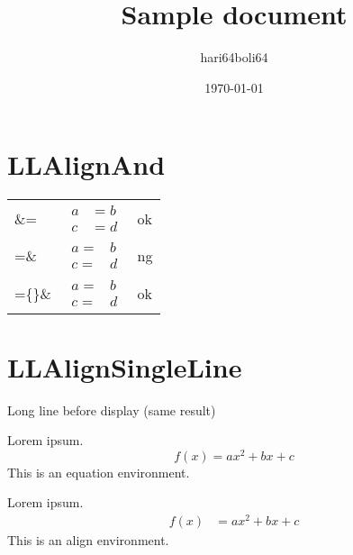 \documentclass[a4paper, 10pt]{article}
\newcommand{\tA}[1]{\textcolor{cA}{#1}}
\newcommand{\tD}[1]{\textcolor{cD}{#1}}
\begin{document}
\title{Sample document}
\author{hari64boli64}
\date{\today}
\maketitle

\section{LLAlignAnd}

\begin{table}[H]
    \centering
    \begin{tabular}{lll}
        \&=              &
        $\begin{aligned}
                 a & = b \\
                 c & = d
             \end{aligned}$ &
        \tA{ok}            \\[0.3cm]
        =\&              &
        $\begin{aligned}
                 a = & b \\
                 c = & d
             \end{aligned}$ &
        \tD{ng}            \\[0.3cm]
        =\{\}\&          &
        $\begin{aligned}
                 a = {} & b \\
                 c = {} & d
             \end{aligned}$ &
        \tA{ok}
    \end{tabular}
\end{table}

\section{LLAlignSingleLine}

\begin{itembox}{\large Long line before display (same result)}
    \begin{minipage}[t]{.5\columnwidth}
        Lorem ipsum.
        \begin{equation*}
            f(x) = ax^2 + bx + c
        \end{equation*}
        This is an \tA{equation} environment.
    \end{minipage}%
    \begin{minipage}[t]{.5\columnwidth}
        Lorem ipsum.
        \begin{align*}
            f(x) & = ax^2 + bx + c
        \end{align*}
        This is an \tD{align} environment.
    \end{minipage}
\end{itembox}
\end{document}
